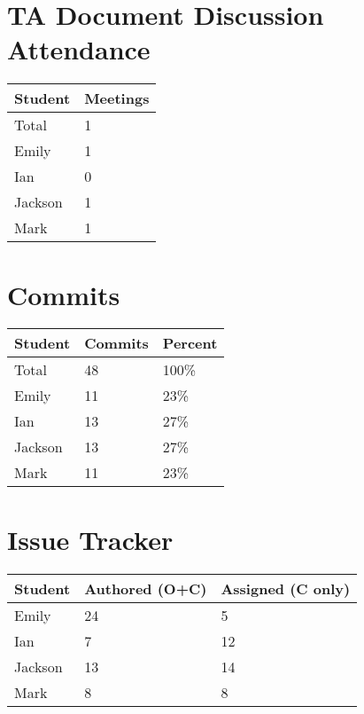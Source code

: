\documentclass{article}
\begin{document}
\section{TA Document Discussion Attendance}

\begin{table}[H]
\centering
\begin{tabular}{ll}
\toprule
\textbf{Student} & \textbf{Meetings}\\
\midrule
Total & 1\\
Emily & 1\\
Ian & 0\\
Jackson & 1\\
Mark & 1\\
\bottomrule
\end{tabular}
\end{table}


\section{Commits}

\begin{table}[H]
\centering
\begin{tabular}{lll}
\toprule
\textbf{Student} & \textbf{Commits} & \textbf{Percent}\\
\midrule
Total & 48 & 100\% \\
Emily & 11 & 23\% \\
Ian & 13 & 27\% \\
Jackson & 13 & 27\% \\
Mark & 11 & 23\% \\
\bottomrule
\end{tabular}
\end{table}

\section{Issue Tracker}


\begin{table}[H]
\centering
\begin{tabular}{lll}
\toprule
\textbf{Student} & \textbf{Authored (O+C)} & \textbf{Assigned (C only)}\\
\midrule
Emily & 24 & 5 \\
Ian & 7 & 12 \\
Jackson & 13 & 14 \\
Mark & 8 & 8 \\
\bottomrule
\end{tabular}
\end{table}
\end{document}
